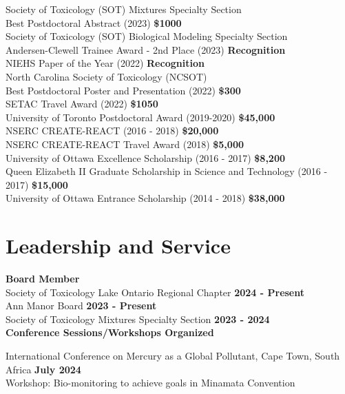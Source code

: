\documentclass[margin,line]{res}
\newcommand\tab[1][1cm]{\hspace*{#1}}
\begin{document}
\begin{resume}
Society of Toxicology (SOT) Mixtures Specialty Section\\
\tab Best Postdoctoral Abstract (2023)
\hfill {\textbf{\$1000}}\\
Society of Toxicology (SOT) Biological Modeling Specialty Section\\
\tab Andersen-Clewell Trainee Award - 2nd Place (2023)
\hfill {\textbf{Recognition}}\\
NIEHS Paper of the Year (2022)
\hfill {\textbf{Recognition}}\\
North Carolina Society of Toxicology (NCSOT)\\
\tab Best Postdoctoral Poster and Presentation (2022)
\hfill {\textbf{\$300}}\\
SETAC Travel Award (2022)
\hfill {\textbf{\$1050}}\\
University of Toronto Postdoctoral Award (2019-2020)
\hfill {\textbf{\$45,000}}\\
NSERC CREATE-REACT (2016 - 2018)
\hfill {\textbf{\$20,000}}\\
NSERC CREATE-REACT Travel Award (2018)
\hfill {\textbf{\$5,000}}\\
University of Ottawa Excellence Scholarship (2016 - 2017)
\hfill {\textbf{\$8,200}}\\
Queen Elizabeth II Graduate Scholarship in Science and Technology (2016 - 2017)
\hfill {\textbf{\$15,000}}\\
University of Ottawa Entrance Scholarship (2014 - 2018)
\hfill {\textbf{\$38,000}}\\

\vspace*{.1in}

\section{\sc Leadership and Service}
{\bf Board Member}\\
{Society of Toxicology Lake Ontario Regional Chapter} \hfill {\bf 2024 - Present}\\
{Ann Manor Board} \hfill {\bf 2023 - Present}\\
{Society of Toxicology Mixtures Specialty Section} \hfill {\bf 2023 - 2024}\\

{\bf Conference Sessions/Workshops Organized}

International Conference on Mercury as a Global Pollutant, Cape Town, South Africa \hfill {\bf July 2024}\\
Workshop: Bio-monitoring to achieve goals in Minamata Convention


\end{resume}
\end{document}
